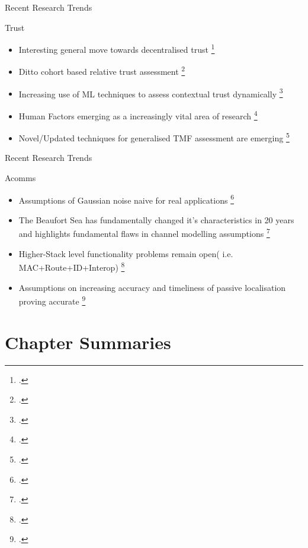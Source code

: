 \documentclass[aspectratio=43]{beamer}
\begin{document}
\begin{frame}{Recent Research Trends}
	\begin{block}{Trust}
		\begin{itemize}
			\item Interesting general move towards decentralised trust \footcite{Korzun2015}
			\item Ditto cohort based relative trust assessment \footcite{Singh2016}
			\item Increasing use of ML techniques to assess contextual trust dynamically \footcite{Rishwaraj2017} 
			\item Human Factors emerging as a increasingly vital area of research \footcite{Saeidi2009,Matthews2016,Lahijanian2016}
			\item Novel/Updated techniques for generalised TMF assessment are emerging \footcite{Janiszewski2016} 
		\end{itemize}
	\end{block}
	
\end{frame}

\begin{frame}{Recent Research Trends}
	\begin{block}{Acomms} %
		\begin{itemize}
			\item Assumptions of Gaussian noise naive for real applications \footcite{Mahmood2016, Deane2016}
			\item The Beaufort Sea has fundamentally changed it's characteristics in 20 years and highlights fundamental flaws in channel modelling assumptions \footcite{Schmidt2016}
			\item Higher-Stack level functionality problems remain open( i.e. MAC+Route+ID+Interop) \footcite{Diamant2016,Petroccia2016,Petroccia2016a, Anjangi2016}
			\item Assumptions on increasing accuracy and timeliness of passive localisation proving accurate \footcite{Vio2016, Ferreira2016,Das2016}
		\end{itemize}
	\end{block}
	
\end{frame}

\section{Chapter Summaries}
\end{document}

